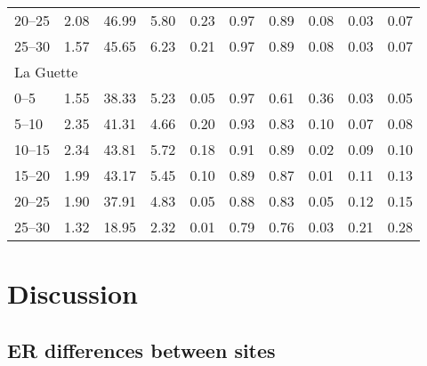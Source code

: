 \begin{table}
\begin{tabular}{llllllllll}
20--25 & 2.08 & 46.99 & 5.80 & 0.23 & 0.97 & 0.89 & 0.08 & 0.03 & 0.07 \\
25--30 & 1.57 & 45.65 & 6.23 & 0.21 & 0.97 & 0.89 & 0.08 & 0.03 & 0.07 \\
\multicolumn{2}{l}{La Guette} & & & & & & & & \\[-.5ex] 
0--5 & 1.55 & 38.33 & 5.23 & 0.05 & 0.97 & 0.61 & 0.36 & 0.03 & 0.05 \\
5--10 & 2.35 & 41.31 & 4.66 & 0.20 & 0.93 & 0.83 & 0.10 & 0.07 & 0.08 \\
10--15 & 2.34 & 43.81 & 5.72 & 0.18 & 0.91 & 0.89 & 0.02 & 0.09 & 0.10 \\
15--20 & 1.99 & 43.17 & 5.45 & 0.10 & 0.89 & 0.87 & 0.01 & 0.11 & 0.13 \\
20--25 & 1.90 & 37.91 & 4.83 & 0.05 & 0.88 & 0.83 & 0.05 & 0.12 & 0.15 \\ 
25--30 & 1.32 & 18.95 & 2.32 & 0.01 & 0.79 & 0.76 & 0.03 & 0.21 & 0.28 \\
\bottomrule
\end{tabular}
\label{table:phychi}
\end{table}

\section{Discussion}

\subsection{ER differences between sites}

